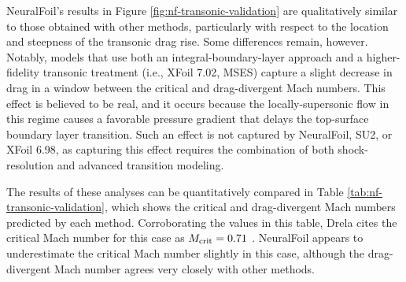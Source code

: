     NeuralFoil's results in Figure \ref{fig:nf-transonic-validation} are qualitatively similar to those obtained with other methods, particularly with respect to the location and steepness of the transonic drag rise. Some differences remain, however. Notably, models that use both an integral-boundary-layer approach and a higher-fidelity transonic treatment (i.e., XFoil 7.02, MSES) capture a slight decrease in drag in a window between the critical and drag-divergent Mach numbers. This effect is believed to be real, and it occurs because the locally-supersonic flow in this regime causes a favorable pressure gradient that delays the top-surface boundary layer transition. Such an effect is not captured by NeuralFoil, SU2, or XFoil 6.98, as capturing this effect requires the combination of both shock-resolution and advanced transition modeling.

    The results of these analyses can be quantitatively compared in Table \ref{tab:nf-transonic-validation}, which shows the critical and drag-divergent Mach numbers predicted by each method. Corroborating the values in this table, Drela cites the critical Mach number for this case as $M_{\rm crit}=0.71$ \cite{drela_flight_2013}. NeuralFoil appears to underestimate the critical Mach number slightly in this case, although the drag-divergent Mach number agrees very closely with other methods.

